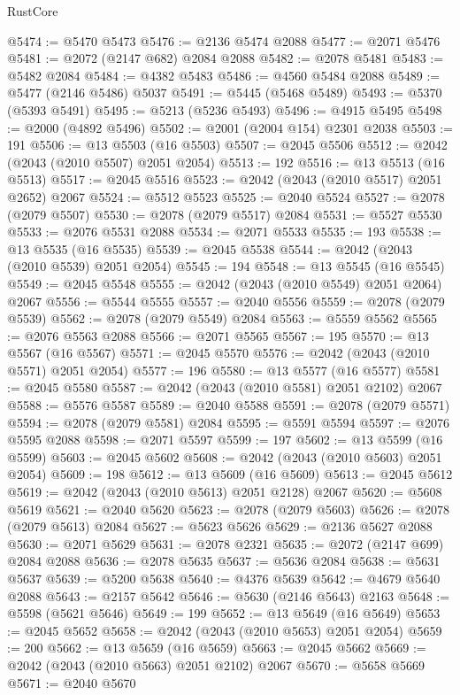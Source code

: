 \begin{lexlean}{RustCore}
\begin{coremodule}
@5474 := @5470 @5473
@5476 := @2136 @5474 @2088
@5477 := @2071 @5476
@5481 := @2072 (@2147 @682) @2084 @2088
@5482 := @2078 @5481
@5483 := @5482 @2084
@5484 := @4382 @5483
@5486 := @4560 @5484 @2088
@5489 := @5477 (@2146 @5486) @5037
@5491 := @5445 (@5468 @5489)
@5493 := @5370 (@5393 @5491)
@5495 := @5213 (@5236 @5493)
@5496 := @4915 @5495
@5498 := @2000 (@4892 @5496)
@5502 := @2001 (@2004 @154) @2301 @2038
@5503 := 191
@5506 := @13 @5503 (@16 @5503)
@5507 := @2045 @5506
@5512 := @2042 (@2043 (@2010 @5507) @2051 @2054)
@5513 := 192
@5516 := @13 @5513 (@16 @5513)
@5517 := @2045 @5516
@5523 := @2042 (@2043 (@2010 @5517) @2051 @2652) @2067
@5524 := @5512 @5523
@5525 := @2040 @5524
@5527 := @2078 (@2079 @5507)
@5530 := @2078 (@2079 @5517) @2084
@5531 := @5527 @5530
@5533 := @2076 @5531 @2088
@5534 := @2071 @5533
@5535 := 193
@5538 := @13 @5535 (@16 @5535)
@5539 := @2045 @5538
@5544 := @2042 (@2043 (@2010 @5539) @2051 @2054)
@5545 := 194
@5548 := @13 @5545 (@16 @5545)
@5549 := @2045 @5548
@5555 := @2042 (@2043 (@2010 @5549) @2051 @2064) @2067
@5556 := @5544 @5555
@5557 := @2040 @5556
@5559 := @2078 (@2079 @5539)
@5562 := @2078 (@2079 @5549) @2084
@5563 := @5559 @5562
@5565 := @2076 @5563 @2088
@5566 := @2071 @5565
@5567 := 195
@5570 := @13 @5567 (@16 @5567)
@5571 := @2045 @5570
@5576 := @2042 (@2043 (@2010 @5571) @2051 @2054)
@5577 := 196
@5580 := @13 @5577 (@16 @5577)
@5581 := @2045 @5580
@5587 := @2042 (@2043 (@2010 @5581) @2051 @2102) @2067
@5588 := @5576 @5587
@5589 := @2040 @5588
@5591 := @2078 (@2079 @5571)
@5594 := @2078 (@2079 @5581) @2084
@5595 := @5591 @5594
@5597 := @2076 @5595 @2088
@5598 := @2071 @5597
@5599 := 197
@5602 := @13 @5599 (@16 @5599)
@5603 := @2045 @5602
@5608 := @2042 (@2043 (@2010 @5603) @2051 @2054)
@5609 := 198
@5612 := @13 @5609 (@16 @5609)
@5613 := @2045 @5612
@5619 := @2042 (@2043 (@2010 @5613) @2051 @2128) @2067
@5620 := @5608 @5619
@5621 := @2040 @5620
@5623 := @2078 (@2079 @5603)
@5626 := @2078 (@2079 @5613) @2084
@5627 := @5623 @5626
@5629 := @2136 @5627 @2088
@5630 := @2071 @5629
@5631 := @2078 @2321
@5635 := @2072 (@2147 @699) @2084 @2088
@5636 := @2078 @5635
@5637 := @5636 @2084
@5638 := @5631 @5637
@5639 := @5200 @5638
@5640 := @4376 @5639
@5642 := @4679 @5640 @2088
@5643 := @2157 @5642
@5646 := @5630 (@2146 @5643) @2163
@5648 := @5598 (@5621 @5646)
@5649 := 199
@5652 := @13 @5649 (@16 @5649)
@5653 := @2045 @5652
@5658 := @2042 (@2043 (@2010 @5653) @2051 @2054)
@5659 := 200
@5662 := @13 @5659 (@16 @5659)
@5663 := @2045 @5662
@5669 := @2042 (@2043 (@2010 @5663) @2051 @2102) @2067
@5670 := @5658 @5669
@5671 := @2040 @5670

\end{coremodule}
\end{lexlean}
